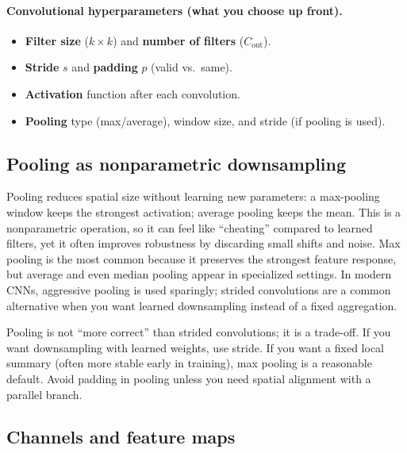 \paragraph{Convolutional hyperparameters (what you choose up front).}
\label{sec:cnn_convolutional_hyperparameters_what_you_choose_up_front}
\begin{itemize}
    \item \textbf{Filter size} (\(k\times k\)) and \textbf{number of filters} (\(C_{\text{out}}\)).
    \item \textbf{Stride} \(s\) and \textbf{padding} \(p\) (valid vs.\ same).
    \item \textbf{Activation} function after each convolution.
    \item \textbf{Pooling} type (max/average), window size, and stride (if pooling is used).
\end{itemize}

\subsection{Pooling as nonparametric downsampling}
\label{sec:cnn_pooling_as_nonparametric_downsampling}

Pooling reduces spatial size without learning new parameters: a max-pooling window keeps the strongest activation; average pooling keeps the mean. This is a nonparametric operation, so it can feel like ``cheating'' compared to learned filters, yet it often improves robustness by discarding small shifts and noise. Max pooling is the most common because it preserves the strongest feature response, but average and even median pooling appear in specialized settings. In modern CNNs, aggressive pooling is used sparingly; strided convolutions are a common alternative when you want learned downsampling instead of a fixed aggregation.

\begin{tcolorbox}[summarybox, title={Author's note: pooling is a design choice}]
Pooling is not ``more correct'' than strided convolutions; it is a trade-off. If you want downsampling with learned weights, use stride. If you want a fixed local summary (often more stable early in training), max pooling is a reasonable default. Avoid padding in pooling unless you need spatial alignment with a parallel branch.
\end{tcolorbox}

\subsection{Channels and feature maps}
\label{sec:cnn_channels_and_feature_maps}

